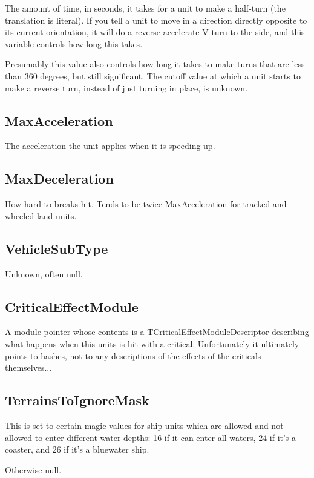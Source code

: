 \documentclass{article}
\begin{document}
The amount of time, in seconds, it takes for a unit to make a half-turn (the translation is literal). If you tell a unit to move in a direction directly opposite to its current orientation, it will do a reverse-accelerate V-turn to the side, and this variable controls how long this takes.

Presumably this value also controls how long it takes to make turns that are less than 360 degrees, but still significant. The cutoff value at which a unit starts to make a reverse turn, instead of just turning in place, is unknown.

\subsection{MaxAcceleration}

The acceleration the unit applies when it is speeding up.

\subsection{MaxDeceleration}

How hard to breaks hit. Tends to be twice MaxAcceleration for tracked and wheeled land units.

\subsection{VehicleSubType}

Unknown, often null.

\subsection{CriticalEffectModule}

A module pointer whose contents is a TCriticalEffectModuleDescriptor describing what happens when this units is hit with a critical. Unfortunately it ultimately points to hashes, not to any descriptions of the effects of the criticals themselves...

\subsection{TerrainsToIgnoreMask}

This is set to certain magic values for ship units which are allowed and not allowed to enter different water depths: 16 if it can enter all waters, 24 if it's a coaster, and 26 if it's a bluewater ship.

Otherwise null.
\end{document}
